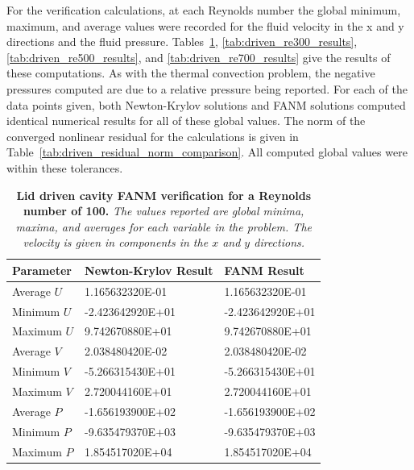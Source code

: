 For the verification calculations, at each Reynolds number the global
minimum, maximum, and average values were recorded for the fluid
velocity in the x and y directions and the fluid
pressure. Tables~\ref{tab:driven_re100_results},
\ref{tab:driven_re300_results}, \ref{tab:driven_re500_results}, and
\ref{tab:driven_re700_results} give the results of these
computations. As with the thermal convection problem, the negative
pressures computed are due to a relative pressure being reported. For
each of the data points given, both Newton-Krylov solutions and FANM
solutions computed identical numerical results for all of these global
values. The norm of the converged nonlinear residual for the
calculations is given in
Table~\ref{tab:driven_residual_norm_comparison}. All computed global
values were within these tolerances.

\begin{table}[h!]
  \begin{center}
    \begin{tabular}{lll}\hline\hline
      \multicolumn{1}{l}{Parameter}& 
      \multicolumn{1}{l}{Newton-Krylov Result}&
      \multicolumn{1}{l}{FANM Result}\\
      \hline
      Average $U$ & 1.165632320E-01 & 1.165632320E-01 \\
      Minimum $U$ & -2.423642920E+01 & -2.423642920E+01 \\
      Maximum $U$ & 9.742670880E+01 & 9.742670880E+01 \\
      \hline
      Average $V$ & 2.038480420E-02 & 2.038480420E-02 \\
      Minimum $V$ & -5.266315430E+01 & -5.266315430E+01 \\
      Maximum $V$ & 2.720044160E+01 & 2.720044160E+01 \\
      \hline
      Average $P$ & -1.656193900E+02 & -1.656193900E+02 \\
      Minimum $P$ & -9.635479370E+03 & -9.635479370E+03 \\
      Maximum $P$ & 1.854517020E+04 & 1.854517020E+04 \\
      \hline\hline
    \end{tabular}
  \end{center}
  \caption{\textbf{Lid driven cavity FANM verification for a Reynolds
      number of 100.} \textit{The values reported are global minima,
      maxima, and averages for each variable in the problem. The
      velocity is given in components in the $x$ and $y$ directions.}}
  \label{tab:driven_re100_results}
\end{table}

